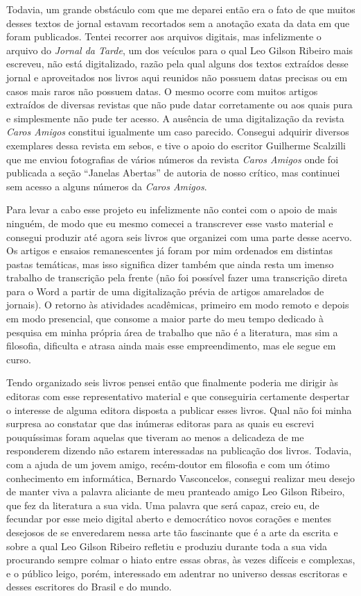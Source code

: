 \documentclass[
  a4paper,
  oneside]{scrbook}
\begin{document}
Todavia, um grande obstáculo com que me deparei então era o fato de que
muitos desses textos de jornal estavam recortados sem a anotação exata
da data em que foram publicados. Tentei recorrer aos arquivos digitais,
mas infelizmente o arquivo do \emph{Jornal da Tarde}, um dos veículos
para o qual Leo Gilson Ribeiro mais escreveu, não está digitalizado,
razão pela qual alguns dos textos extraídos desse jornal e aproveitados
nos livros aqui reunidos não possuem datas precisas ou em casos mais
raros não possuem datas. O mesmo ocorre com muitos artigos extraídos de
diversas revistas que não pude datar corretamente ou aos quais pura e
simplesmente não pude ter acesso. A ausência de uma digitalização da
revista \emph{Caros Amigos} constitui igualmente um caso parecido.
Consegui adquirir diversos exemplares dessa revista em sebos, e tive o
apoio do escritor Guilherme Scalzilli que me enviou fotografias de
vários números da revista \emph{Caros Amigos} onde foi publicada a seção
``Janelas Abertas'' de autoria de nosso crítico, mas continuei sem
acesso a alguns números da \emph{Caros Amigos}.

Para levar a cabo esse projeto eu infelizmente não contei com o apoio de
mais ninguém, de modo que eu mesmo comecei a transcrever esse vasto
material e consegui produzir até agora seis livros que organizei com uma
parte desse acervo. Os artigos e ensaios remanescentes já foram por mim
ordenados em distintas pastas temáticas, mas isso significa dizer também
que ainda resta um imenso trabalho de transcrição pela frente (não foi
possível fazer uma transcrição direta para o Word a partir de uma
digitalização prévia de artigos amarelados de jornais). O retorno às
atividades acadêmicas, primeiro em modo remoto e depois em modo
presencial, que consome a maior parte do meu tempo dedicado à pesquisa
em minha própria área de trabalho que não é a literatura, mas sim a
filosofia, dificulta e atrasa ainda mais esse empreendimento, mas ele
segue em curso.

Tendo organizado seis livros pensei então que finalmente poderia me
dirigir às editoras com esse representativo material e que conseguiria
certamente despertar o interesse de alguma editora disposta a publicar
esses livros. Qual não foi minha surpresa ao constatar que das inúmeras
editoras para as quais eu escrevi pouquíssimas foram aquelas que tiveram
ao menos a delicadeza de me responderem dizendo não estarem interessadas
na publicação dos livros. Todavia, com a ajuda de um jovem amigo,
recém-doutor em filosofia e com um ótimo conhecimento em informática,
Bernardo Vasconcelos, consegui realizar meu desejo de manter viva a
palavra aliciante de meu pranteado amigo Leo Gilson Ribeiro, que fez da
literatura a sua vida. Uma palavra que será capaz, creio eu, de fecundar
por esse meio digital aberto e democrático novos corações e mentes
desejosos de se enveredarem nessa arte tão fascinante que é a arte da
escrita e sobre a qual Leo Gilson Ribeiro refletiu e produziu durante
toda a sua vida procurando sempre colmar o hiato entre essas obras, às
vezes difíceis e complexas, e o público leigo, porém, interessado em
adentrar no universo dessas escritoras e desses escritores do Brasil e
do mundo.
\end{document}

